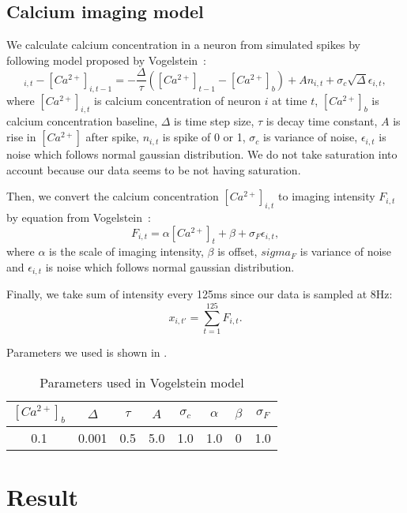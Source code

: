 \subsection{Calcium imaging model}
We calculate calcium concentration in a neuron from simulated spikes by following model proposed by Vogelstein~\cite{Vogelstein2009}:
\begin{equation}
  [Ca^{2+}]_{i,t} - [Ca^{2+}]_{i,t-1} = - \frac{\Delta}{\tau}([Ca^{2+}]_{t-1} - [Ca^{2+}]_b) + An_{i,t} + \sigma_c \sqrt{\Delta} \epsilon_{i,t},
  \label{eq:calcium}
\end{equation}
where $[Ca^{2+}]_{i,t}$ is calcium concentration of neuron $i$ at time $t$, $[Ca^{2+}]_b$ is calcium concentration baseline, $\Delta$ is time step size, $\tau$ is decay time constant, $A$ is rise in $[Ca^{2+}]$ after spike, $n_{i,t}$ is spike of 0 or 1, $\sigma_c$ is variance of noise, $\epsilon_{i,t}$ is noise which follows normal gaussian distribution.
We do not take saturation into account because our data seems to be not having saturation.

Then, we convert the calcium concentration $[Ca^{2+}]_{i,t}$ to imaging intensity $F_{i,t}$ by equation from Vogelstein~\cite{Vogelstein2009}:
\begin{equation}
  F_{i,t} = \alpha[Ca^{2+}]_t + \beta + \sigma_F \epsilon_{i,t},
  \label{eq:intensity}
\end{equation}
where $\alpha$ is the scale of imaging intensity, $\beta$ is offset, $sigma_F$ is variance of noise and $\epsilon_{i,t}$ is noise which follows normal gaussian distribution.

Finally, we take sum of intensity every 125ms since our data is sampled at 8Hz:
\begin{equation}
  x_{i,t'} = \sum_{t=1}^{125} F_{i,t}.
  \label{eq:observation}
\end{equation}

Parameters we used is shown in .
\begin{table}[htb]
  \center
  \begin{tabular}{|cccccccc|} \hline
    $[Ca^{2+}]_b$ & $\Delta$ & $\tau$ & $A$ & $\sigma_c$ & $\alpha$ & $\beta$ & $\sigma_F$ \\ \hline
    0.1 & 0.001 & 0.5 & 5.0 & 1.0 & 1.0 & 0 & 1.0 \\ \hline
  \end{tabular}
  \caption{Parameters used in Vogelstein model}
  \label{tab:parameter2}
\end{table}

\section{Result}
